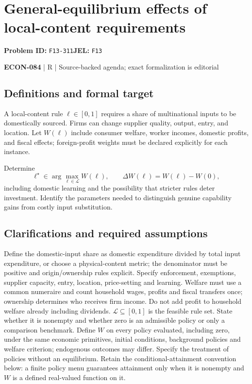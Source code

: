 \documentclass[11pt,a4paper]{article}
\begin{document}
\section*{General-equilibrium effects of local-content requirements}
\textbf{Problem ID:} \texttt{F13-311}\quad \textbf{JEL:} \texttt{F13}\par
\label{problem:OP-0646}


\label{audited:ECON-084}

{\sffamily\small\color{muted}\textbf{ECON-084} | R | Source-backed agenda; exact formalization is editorial\par}

\subsection*{Definitions and formal target}

A local-content rule $\ell\in[0,1]$ requires a share of multinational inputs to be domestically sourced. Firms can change supplier quality, output, entry, and location. Let $W(\ell)$ include consumer welfare, worker incomes, domestic profits, and fiscal effects; foreign-profit weights must be declared explicitly for each instance.

Determine
\[
 \ell^\star\in\arg\max_{\ell\in\mathcal L}W(\ell),\qquad
 \Delta W(\ell)=W(\ell)-W(0),
\]
including domestic learning and the possibility that stricter rules deter investment. Identify the parameters needed to distinguish genuine capability gains from costly input substitution.

\subsection*{Clarifications and required assumptions}

Define the domestic-input share as domestic expenditure divided by total input expenditure, or choose a physical-content metric; the denominator must be positive and origin/ownership rules explicit. Specify enforcement, exemptions, supplier capacity, entry, location, price-setting and learning. Welfare must use a common numeraire and count household wages, profits and fiscal transfers once; ownership determines who receives firm income. Do not add profit to household welfare already including dividends. \(\mathcal L\subseteq[0,1]\) is the feasible rule set. State whether it is nonempty and whether zero is an admissible policy or only a comparison benchmark. Define \(W\) on every policy evaluated, including zero, under the same economic primitives, initial conditions, background policies and welfare criterion; endogenous outcomes may differ. Specify the treatment of policies without an equilibrium. Retain the conditional-attainment convention below: a finite policy menu guarantees attainment only when it is nonempty and \(W\) is a defined real-valued function on it.
\end{document}
